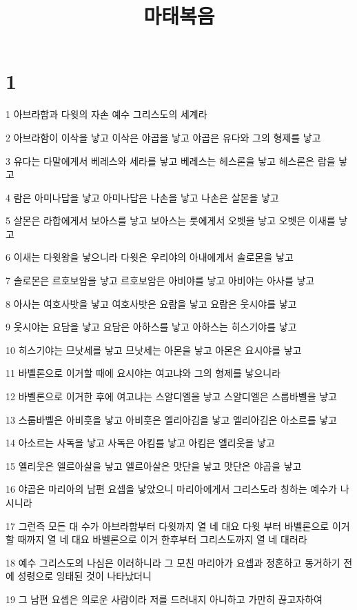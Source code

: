 

\title{마태복음}


\chapter{1}

\par 1 아브라함과 다윗의 자손 예수 그리스도의 세계라
\par 2 아브라함이 이삭을 낳고 이삭은 야곱을 낳고 야곱은 유다와 그의 형제를 낳고
\par 3 유다는 다말에게서 베레스와 세라를 낳고 베레스는 헤스론을 낳고 헤스론은 람을 낳고
\par 4 람은 아미나답을 낳고 아미나답은 나손을 낳고 나손은 살몬을 낳고
\par 5 살몬은 라합에게서 보아스를 낳고 보아스는 룻에게서 오벳을 낳고 오벳은 이새를 낳고
\par 6 이새는 다윗왕을 낳으니라 다윗은 우리야의 아내에게서 솔로몬을 낳고
\par 7 솔로몬은 르호보암을 낳고 르호보암은 아비야를 낳고 아비야는 아사를 낳고
\par 8 아사는 여호사밧을 낳고 여호사밧은 요람을 낳고 요람은 웃시야를 낳고
\par 9 웃시야는 요담을 낳고 요담은 아하스를 낳고 아하스는 히스기야를 낳고
\par 10 히스기야는 므낫세를 낳고 므낫세는 아몬을 낳고 아몬은 요시야를 낳고
\par 11 바벨론으로 이거할 때에 요시야는 여고냐와 그의 형제를 낳으니라
\par 12 바벨론으로 이거한 후에 여고냐는 스알디엘을 낳고 스알디엘은 스룹바벨을 낳고
\par 13 스룹바벨은 아비훗을 낳고 아비훗은 엘리아김을 낳고 엘리아김은 아소르를 낳고
\par 14 아소르는 사독을 낳고 사독은 아킴를 낳고 아킴은 엘리웃을 낳고
\par 15 엘리웃은 엘르아살을 낳고 엘르아살은 맛단을 낳고 맛단은 야곱을 낳고
\par 16 야곱은 마리아의 남편 요셉을 낳았으니 마리아에게서 그리스도라 칭하는 예수가 나시니라
\par 17 그런즉 모든 대 수가 아브라함부터 다윗까지 열 네 대요 다윗 부터 바벨론으로 이거할 때까지 열 네 대요 바벨론으로 이거 한후부터 그리스도까지 열 네 대러라
\par 18 예수 그리스도의 나심은 이러하니라 그 모친 마리아가 요셉과 정혼하고 동거하기 전에 성령으로 잉태된 것이 나타났더니
\par 19 그 남편 요셉은 의로운 사람이라 저를 드러내지 아니하고 가만히 끊고자하여
